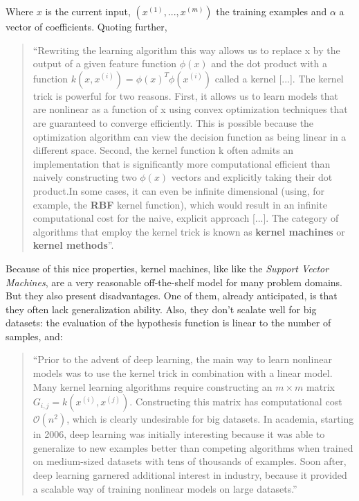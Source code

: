 Where \(x\) is the current input, \((x^{(1)}, ..., x^{(m)})\) the training examples and \(\alpha\) a vector of coefficients. Quoting further,
\begin{quote}
  ``Rewriting the learning algorithm this way allows us to replace x by the output of a given feature function \(\phi(x)\) and the dot product with a function \(k(x, x^{(i)}) = \phi(x)^T\phi(x^{(i)})\) called a kernel [...]. The kernel trick is powerful for two reasons. First, it allows us to learn models that are nonlinear as a function of x using convex optimization techniques that are guaranteed to converge efficiently. This is possible because the optimization algorithm can view the decision function as being linear in a different space. Second, the kernel function k often admits an implementation that is significantly more computational efficient than naively constructing two \(\phi(x)\) vectors and explicitly taking their dot product.In some cases, it can even be infinite dimensional (using, for example, the \textbf{RBF} kernel function), which would result in an infinite computational cost for the naive, explicit approach [...]. The category of algorithms that employ the kernel trick is known as \textbf{kernel machines} or \textbf{kernel methods}''.\cite[p.141]{goodfellow}
\end{quote}

Because of this nice properties, kernel machines, like like the {\it Support Vector Machines}, are a very reasonable off-the-shelf model for many problem domains. But they also present disadvantages. One of them, already anticipated, is that they often lack generalization ability. Also, they don't scalate well for big datasets: the evaluation of the hypothesis function is linear to the number of samples, and:

\begin{quote}
  ``Prior to the advent of deep learning, the main way to learn nonlinear models was to use the kernel trick in combination with a linear model. Many kernel learning algorithms require constructing an \(m\times m\) matrix \(G_{i,j} = k(x^{(i)},x^{(j)})\). Constructing this matrix has computational cost $\mathcal{O}(n^2)$, which is clearly undesirable for big datasets. In academia, starting in 2006, deep learning was initially interesting because it was able to generalize to new examples better than competing algorithms when trained on medium-sized datasets with tens of thousands of examples. Soon after, deep learning garnered additional interest in industry, because it provided a scalable way of training nonlinear models on large datasets.''\cite[p.152]{goodfellow}
\end{quote}

